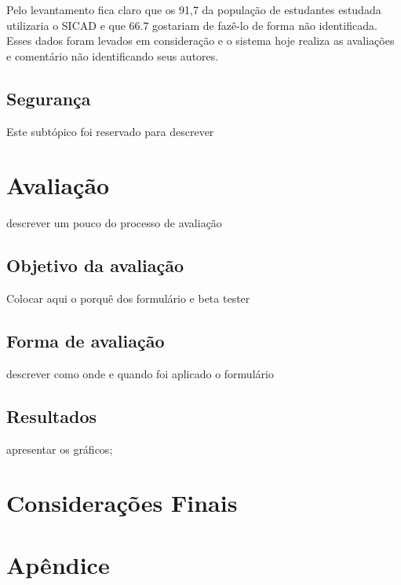 \documentclass[12pt, a4paper]{report}
\begin{document}
\results
{}
\begin{figure}
\centering
{}
\caption{}
\label{fig:perguntab}
\end{figure}

Pelo levantamento fica claro que os 91,7 da população de estudantes estudada utilizaria o SICAD e que 66.7 gostariam de fazê-lo de forma não identificada. Esses dados foram levados em consideração e o sistema hoje realiza as avaliações e comentário não identificando seus autores.

\section{ Segurança}
Este subtópico foi reservado para descrever 

\chapter{Avaliação}
descrever um pouco do processo de avaliação
\section{Objetivo da avaliação }
 Colocar aqui o porquê dos formulário e beta tester
\section{Forma de avaliação }
 descrever como onde e quando foi aplicado o formulário
\section{Resultados } 
 apresentar os gráficos;
\chapter{Considerações Finais}


\renewcommand\bibname{Referências}

%
%

\nocite{*}


\appendix
\chapter{Apêndice}
\label{ape:apendice}

\label{whatever}
\end{document}
